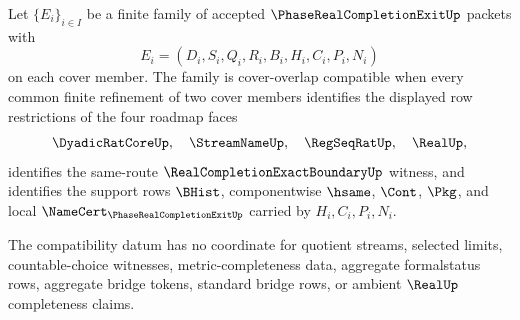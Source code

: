 \begin{definition}
\label{def:phase-real-completion-exit-cover-overlap-compatibility}
Let $\{E_i\}_{i \in I}$ be a finite family of accepted $\PhaseRealCompletionExitUp$ packets with
$$
E_i=(D_i,S_i,Q_i,R_i,B_i,H_i,C_i,P_i,N_i)
$$
on each cover member. The family is cover-overlap compatible when every common finite refinement of two cover members identifies the displayed row restrictions of the four roadmap faces
$$
\DyadicRatCoreUp,\quad \StreamNameUp,\quad \RegSeqRatUp,\quad \RealUp,
$$
identifies the same-route $\RealCompletionExactBoundaryUp$ witness, and identifies the support rows $\BHist$, componentwise $\hsame$, $\Cont$, $\Pkg$, and local $\NameCert_{\PhaseRealCompletionExitUp}$ carried by $H_i,C_i,P_i,N_i$.

The compatibility datum has no coordinate for quotient streams, selected limits, countable-choice witnesses, metric-completeness data, aggregate formalstatus rows, aggregate bridge tokens, standard bridge rows, or ambient $\RealUp$ completeness claims.
\end{definition}

